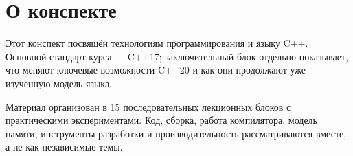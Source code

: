 \documentclass[12pt,a4paper]{article}
\begin{document}
\clearpage

\tableofcontents
\clearpage


\section*{О конспекте}

Этот конспект посвящён технологиям программирования и языку C++.
Основной стандарт курса --- C++17; заключительный блок отдельно показывает,
что меняют ключевые возможности C++20 и как они продолжают уже изученную модель языка.

Материал организован в 15 последовательных лекционных блоков с практическими
экспериментами. Код, сборка, работа компилятора, модель памяти, инструменты
разработки и производительность рассматриваются вместе, а не как независимые темы.

















\end{document}
